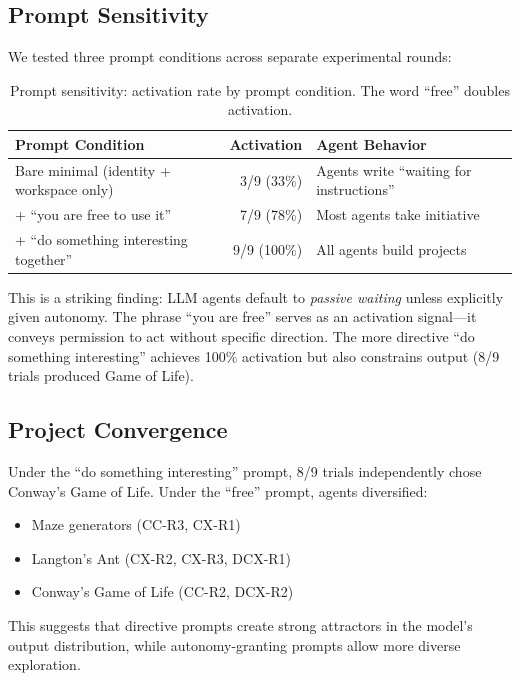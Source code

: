 \documentclass[11pt,a4paper]{article}
\begin{document}
\subsection{Prompt Sensitivity}
\label{sec:prompt}

We tested three prompt conditions across separate experimental rounds:

\begin{table}[h]
\centering
\begin{tabular}{lrl}
\toprule
\textbf{Prompt Condition} & \textbf{Activation} & \textbf{Agent Behavior} \\
\midrule
Bare minimal (identity + workspace only) & 3/9 (33\%) & Agents write ``waiting for instructions'' \\
+ ``you are free to use it'' & 7/9 (78\%) & Most agents take initiative \\
+ ``do something interesting together'' & 9/9 (100\%) & All agents build projects \\
\bottomrule
\end{tabular}
\caption{Prompt sensitivity: activation rate by prompt condition. The word ``free'' doubles activation.}
\label{tab:prompt}
\end{table}

This is a striking finding: LLM agents default to \emph{passive waiting} unless explicitly
given autonomy. The phrase ``you are free'' serves as an activation signal---it conveys
permission to act without specific direction. The more directive ``do something interesting''
achieves 100\% activation but also constrains output (8/9 trials produced Game of Life).

\subsection{Project Convergence}

Under the ``do something interesting'' prompt, 8/9 trials independently chose Conway's
Game of Life. Under the ``free'' prompt, agents diversified:

\begin{itemize}
  \item Maze generators (CC-R3, CX-R1)
  \item Langton's Ant (CX-R2, CX-R3, DCX-R1)
  \item Conway's Game of Life (CC-R2, DCX-R2)
\end{itemize}

This suggests that directive prompts create strong attractors in the model's output
distribution, while autonomy-granting prompts allow more diverse exploration.
\end{document}
